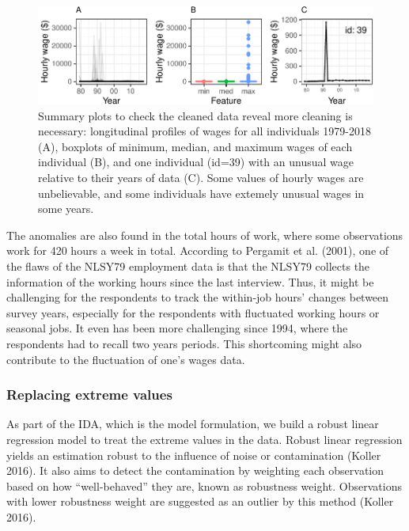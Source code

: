 \documentclass{article}
\begin{document}
\begin{figure}

{\centering \includegraphics[width=432px]{figures/feature-plot-1} 

}

\caption{Summary plots to check the cleaned data reveal more cleaning is necessary: longitudinal profiles of wages for all individuals 1979-2018 (A), boxplots of minimum, median, and maximum wages of each individual (B), and one individual (id=39) with an unusual wage relative to their years of data (C). Some values of hourly wages are unbelievable, and some individuals have extemely unusual wages in some years.}\label{fig:feature-plot}
\end{figure}

The anomalies are also found in the total hours of work, where some observations work for 420 hours a week in total. According to Pergamit et al. (2001), one of the flaws of the NLSY79 employment data is that the NLSY79 collects the information of the working hours since the last interview. Thus, it might be challenging for the respondents to track the within-job hours' changes between survey years, especially for the respondents with fluctuated working hours or seasonal jobs. It even has been more challenging since 1994, where the respondents had to recall two years periods. This shortcoming might also contribute to the fluctuation of one's wages data.

\hypertarget{replacing-extreme-values}{%
\subsubsection{Replacing extreme values}\label{replacing-extreme-values}}

As part of the IDA, which is the model formulation, we build a robust linear regression model to treat the extreme values in the data. Robust linear regression yields an estimation robust to the influence of noise or contamination (Koller 2016). It also aims to detect the contamination by weighting each observation based on how ``well-behaved'' they are, known as robustness weight. Observations with lower robustness weight are suggested as an outlier by this method (Koller 2016).
\end{document}
